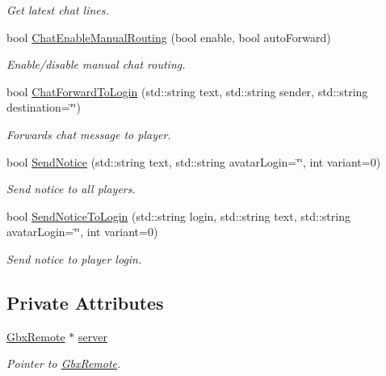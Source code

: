 \begin{DoxyCompactItemize}
\begin{DoxyCompactList}\small\item\em Get latest chat lines. \end{DoxyCompactList}\item 
bool \hyperlink{classMethods_aa6aed7b14ccfce003243e7d21fec70b4}{Chat\-Enable\-Manual\-Routing} (bool enable, bool auto\-Forward)
\begin{DoxyCompactList}\small\item\em Enable/disable manual chat routing. \end{DoxyCompactList}\item 
bool \hyperlink{classMethods_ab0a918ef2ae8ba45fa350f023d7174ab}{Chat\-Forward\-To\-Login} (std\-::string text, std\-::string sender, std\-::string destination=\char`\"{}\char`\"{})
\begin{DoxyCompactList}\small\item\em Forwards chat message to player. \end{DoxyCompactList}\item 
bool \hyperlink{classMethods_add538878f839a6a5078fec808e1f064f}{Send\-Notice} (std\-::string text, std\-::string avatar\-Login=\char`\"{}\char`\"{}, int variant=0)
\begin{DoxyCompactList}\small\item\em Send notice to all players. \end{DoxyCompactList}\item 
bool \hyperlink{classMethods_a7229aacea5b60d1d502c5df39f10a50c}{Send\-Notice\-To\-Login} (std\-::string login, std\-::string text, std\-::string avatar\-Login=\char`\"{}\char`\"{}, int variant=0)
\begin{DoxyCompactList}\small\item\em Send notice to player login. \end{DoxyCompactList}\end{DoxyCompactItemize}
\subsection*{Private Attributes}
\begin{DoxyCompactItemize}
\item 
\hypertarget{classMethods_a3236d275d78d0836cb633de4b1ab5dd8}{\hyperlink{classGbxRemote}{Gbx\-Remote} $\ast$ \hyperlink{classMethods_a3236d275d78d0836cb633de4b1ab5dd8}{server}}\label{classMethods_a3236d275d78d0836cb633de4b1ab5dd8}

\begin{DoxyCompactList}\small\item\em Pointer to \hyperlink{classGbxRemote}{Gbx\-Remote}. \end{DoxyCompactList}\end{DoxyCompactItemize}


